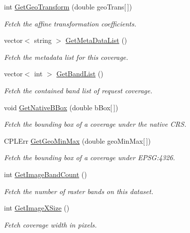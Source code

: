 \begin{DoxyCompactItemize}
int \hyperlink{classAbstractDataset_adbf83ce500a0f30b79ca682df26638e4}{GetGeoTransform} (double geoTrans\mbox{[}$\,$\mbox{]})
\begin{DoxyCompactList}\small\item\em Fetch the affine transformation coefficients. \end{DoxyCompactList}\item 
vector$<$ string $>$ \hyperlink{classAbstractDataset_a736080454f7ac794c710f00da26e37f9}{GetMetaDataList} ()
\begin{DoxyCompactList}\small\item\em Fetch the metadata list for this coverage. \end{DoxyCompactList}\item 
vector$<$ int $>$ \hyperlink{classAbstractDataset_a83b521f96ef4b5fe5b5062707ecc7f40}{GetBandList} ()
\begin{DoxyCompactList}\small\item\em Fetch the contained band list of request coverage. \end{DoxyCompactList}\item 
void \hyperlink{classAbstractDataset_a919760d8e60c26b105740bc2bc109b0e}{GetNativeBBox} (double bBox\mbox{[}$\,$\mbox{]})
\begin{DoxyCompactList}\small\item\em Fetch the bounding box of a coverage under the native CRS. \end{DoxyCompactList}\item 
CPLErr \hyperlink{classAbstractDataset_a66a65ce60f813d0ef683919a098b8a98}{GetGeoMinMax} (double geoMinMax\mbox{[}$\,$\mbox{]})
\begin{DoxyCompactList}\small\item\em Fetch the bounding box of a coverage under EPSG:4326. \end{DoxyCompactList}\item 
int \hyperlink{classAbstractDataset_a83c0bc843f701e8b20b5408b9c7e0731}{GetImageBandCount} ()
\begin{DoxyCompactList}\small\item\em Fetch the number of raster bands on this dataset. \end{DoxyCompactList}\item 
int \hyperlink{classAbstractDataset_a950e120c5a1e9fa06ee5b02ed4fc6c42}{GetImageXSize} ()
\begin{DoxyCompactList}\small\item\em Fetch coverage width in pixels. \end{DoxyCompactList}\item 

\end{DoxyCompactItemize}
